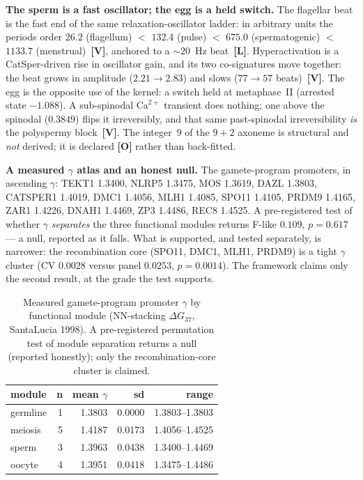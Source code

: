 \documentclass[11pt]{article}
\newcommand{\gradeV}{\textcolor{verified}{\textbf{[V]}}}
\newcommand{\gradeL}{\textcolor{verified}{\textbf{[L]}}}
\newcommand{\gradeO}{\textcolor{open}{\textbf{[O]}}}
\begin{document}
\textbf{The sperm is a fast oscillator; the egg is a held switch.} The flagellar beat is the fast end of the
same relaxation-oscillator ladder: in arbitrary units the periods order
$26.2$ (flagellum) $<$ $132.4$ (pulse) $<$
$675.0$ (spermatogenic) $<$ $1133.7$
(menstrual)~\gradeV{}, anchored to a $\sim20$~Hz beat~\gradeL{}.
Hyperactivation is a CatSper-driven rise in oscillator gain, and its two co-signatures move together: the beat
grows in amplitude ($2.21 \to 2.83$)
and slows ($77 \to 57$
beats)~\gradeV{}. The egg is the opposite use of the kernel: a switch held at metaphase~II (arrested state
$-1.088$). A sub-spinodal $\mathrm{Ca}^{2+}$ transient does nothing; one above
the spinodal ($0.3849$) flips it irreversibly, and that same past-spinodal
irreversibility \emph{is} the polyspermy block~\gradeV{}. The integer~9 of the $9{+}2$ axoneme is structural and
\emph{not} derived; it is declared \gradeO{} rather than back-fitted.

\textbf{A measured $\gamma$ atlas and an honest null.} The gamete-program promoters, in ascending $\gamma$:
TEKT1 1.3400, NLRP5 1.3475, MOS 1.3619, DAZL 1.3803, CATSPER1 1.4019, DMC1 1.4056, MLH1 1.4085, SPO11 1.4105, PRDM9 1.4165, ZAR1 1.4226, DNAH1 1.4469, ZP3 1.4486, REC8 1.4525. A pre-registered test of whether $\gamma$ \emph{separates} the three functional modules
returns F-like $0.109$, $p=0.617$ --- a
null, reported as it falls. What is supported, and tested separately, is narrower: the recombination core
(SPO11, DMC1, MLH1, PRDM9) is a tight $\gamma$ cluster (CV $0.0028$ versus panel
$0.0253$, $p=0.0014$). The framework
claims only the second result, at the grade the test supports.

\begin{table}[H]
\centering
\small
\caption{Measured gamete-program promoter $\gamma$ by functional module (NN-stacking $\Delta G_{37}$, SantaLucia 1998). A pre-registered permutation test of module separation returns a null (reported honestly); only the recombination-core cluster is claimed.}
\label{tab:gamete-gamma}
\begin{tabular}{lrrrr}
\toprule
module & n & mean $\gamma$ & sd & range \\
\midrule
germline & 1 & 1.3803 & 0.0000 & 1.3803--1.3803 \\
meiosis & 5 & 1.4187 & 0.0173 & 1.4056--1.4525 \\
sperm & 3 & 1.3963 & 0.0438 & 1.3400--1.4469 \\
oocyte & 4 & 1.3951 & 0.0418 & 1.3475--1.4486 \\
\bottomrule
\end{tabular}
\end{table}
\end{document}
